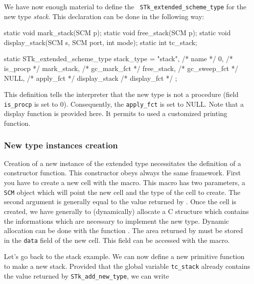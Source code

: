 \documentclass[10pt]{article}
\begin{document}
We have now enough material to define the {\tt
STk\_extended\_scheme\_type} for the new type {\em stack}. This
declaration can be done in the following way:
\begin{Code}
\begin{listing}[200]{2}
static void mark_stack(SCM p);
static void free_stack(SCM p);
static void display_stack(SCM s, SCM port, int mode);
static int tc_stack;
\end{listing}
\end{Code}
\begin{Code}
\begin{listing}[200]{2}
static STk_extended_scheme_type stack_type = {
  "stack",              /* name */
  0,                    /* is_procp */
  mark_stack,           /* gc_mark_fct */
  free_stack,           /* gc_sweep_fct */
  NULL,                 /* apply_fct */
  display_stack         /* display_fct */
};
\end{listing}
\end{Code}

This definition tells the interpreter that the new type is not a
procedure (field  {\tt is\_procp} is set to 0). Consequently, the 
{\tt apply\_fct} is set to NULL. Note that a display function is
provided here. It permits to used a customized printing
function. 

\subsubsection{New type instances creation}

Creation of a new instance of the extended type necessitates the
definition of a constructor function. This constructor obeys always
the same framework. First you have to create a new cell with the
 macro. This macro has two parameters, a {\tt SCM}
object which will point the new cell and the type of the cell to
create. The second argument is generally equal to the value returned by 
. 
Once the cell is created, we have generally to (dynamically) allocate
a C structure which contains the informations which are necessary to
implement the new type. Dynamic allocation  can be done with the
function . The area returned by 
 must be stored in the {\tt data} field of
the new cell. This field can be accessed with the 
macro. 

Let's go back to the stack example. We can now define a new primitive
function to make a new stack. Provided that the global variable {\tt tc\_stack}
already contains the value returned by {\tt STk\_add\_new\_type}, we
can write
\end{document}
